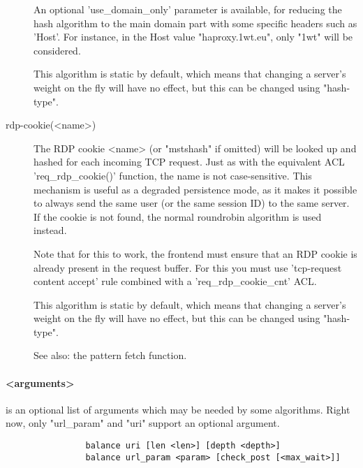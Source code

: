 \begin{description}
                  An optional 'use\_domain\_only' parameter is available, for
                  reducing the hash algorithm to the main domain part with some
                  specific headers such as 'Host'. For instance, in the Host
                  value "haproxy.1wt.eu", only "1wt" will be considered.

                  This algorithm is static by default, which means that
                  changing a server's weight on the fly will have no effect,
                  but this can be changed using "hash-type".

      \item[rdp-cookie(<name>)]
                  The RDP cookie <name> (or "mstshash" if omitted) will be
                  looked up and hashed for each incoming TCP request. Just as
                  with the equivalent ACL 'req\_rdp\_cookie()' function, the name
                  is not case-sensitive. This mechanism is useful as a degraded
                  persistence mode, as it makes it possible to always send the
                  same user (or the same session ID) to the same server. If the
                  cookie is not found, the normal roundrobin algorithm is
                  used instead.

                  Note that for this to work, the frontend must ensure that an
                  RDP cookie is already present in the request buffer. For this
                  you must use 'tcp-request content accept' rule combined with
                  a 'req\_rdp\_cookie\_cnt' ACL.

                  This algorithm is static by default, which means that
                  changing a server's weight on the fly will have no effect,
                  but this can be changed using "hash-type".


See also: the  pattern fetch function.
       \end{description}

    \paragraph*{<arguments>}
                is an optional list of arguments which may be needed by some
                algorithms. Right now, only "url\_param" and "uri" support an
                optional argument.

                \begin{verbatim}
                balance uri [len <len>] [depth <depth>]
                balance url_param <param> [check_post [<max_wait>]]
                \end{verbatim}

